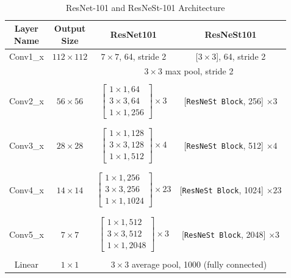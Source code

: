 \documentclass [MAS] {uclathes}
\begin{document}
\

\begin{table}[h!]
\centering
\footnotesize 
\renewcommand{\arraystretch}{0.7}
\begin{tabular}{ c | c | c | c } 
\hline
\makecell{\textbf{Layer} \\ \textbf{Name}} & \makecell{\textbf{Output} \\ \textbf{Size}} & \textbf{ResNet101} & \textbf{ResNeSt101}\\ 
\hline
\hline
Conv1\_x & $112 \times 112$ & $7 \times 7$, 64, stride 2 & [$3\times 3$], 64, stride 2\\
\hline
 &  & \multicolumn{2}{c}{$3 \times 3$ max pool, stride 2}\\
\hline
&  & & \\
Conv2\_x & $56 \times 56$ & $\begin{bmatrix} 1 \times 1, 64  \\ 3 \times 3, 64 \\ 1 \times 1, 256 \end{bmatrix} \times 3$ & [\texttt{ResNeSt Block}, 256] $\times 3$\\
&  & & \\
\hline
&  & & \\
Conv3\_x & $28 \times 28$ & $\begin{bmatrix} 1 \times 1, 128  \\ 3 \times 3, 128 \\ 1 \times 1, 512 \end{bmatrix} \times 4$ & [\texttt{ResNeSt Block}, 512] $\times 4$\\
&  & & \\
\hline
&  & & \\
Conv4\_x & $14 \times 14$ & $\begin{bmatrix} 1 \times 1, 256  \\ 3 \times 3, 256 \\ 1 \times 1, 1024 \end{bmatrix} \times 23$ & [\texttt{ResNeSt Block}, 1024] $\times 23$\\
&  & & \\
\hline
&  & & \\
Conv5\_x & $7 \times 7$ & $\begin{bmatrix} 1 \times 1, 512  \\ 3 \times 3, 512 \\ 1 \times 1, 2048 \end{bmatrix} \times 3$ & [\texttt{ResNeSt Block}, 2048] $\times 3$\\
&  & & \\
\hline
Linear & $1 \times 1$ & \multicolumn{2}{c}{$3 \times 3$ average pool, 1000 (fully connected)}\\
\hline  
\end{tabular}
\label{tab:resnet_resnest_archs}
\caption{ResNet-101 and ResNeSt-101 Architecture}
\end{table}
\end{document}
